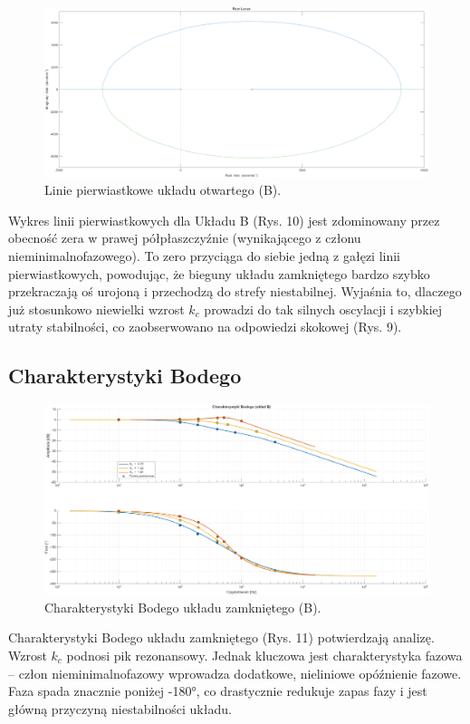 \documentclass[12pt,a4paper]{article}
\begin{document}
	\begin{figure}[H]
		\centering
		\includegraphics[width=0.8\linewidth]{zdjecia/LP_ukladB.png}
		\caption{Linie pierwiastkowe układu otwartego (B).}
		\label{fig:LP_ukladB}
	\end{figure}
	
	Wykres linii pierwiastkowych dla Układu B (Rys. 10) jest zdominowany przez obecność zera w prawej półpłaszczyźnie (wynikającego z członu nieminimalnofazowego). To zero przyciąga do siebie jedną z gałęzi linii pierwiastkowych, powodując, że bieguny układu zamkniętego bardzo szybko przekraczają oś urojoną i przechodzą do strefy niestabilnej. Wyjaśnia to, dlaczego już stosunkowo niewielki wzrost $k_c$ prowadzi do tak silnych oscylacji i szybkiej utraty stabilności, co zaobserwowano na odpowiedzi skokowej (Rys. 9).
	
	\subsection{Charakterystyki Bodego}
	
	\begin{figure}[H]
		\centering
		\includegraphics[width=1\linewidth]{zdjecia/Bode_ukladB.png}
		\caption{Charakterystyki Bodego układu zamkniętego (B).}
		\label{fig:Bode_ukladB}
	\end{figure}
	
	Charakterystyki Bodego układu zamkniętego (Rys. 11) potwierdzają analizę. Wzrost $k_c$ podnosi pik rezonansowy. Jednak kluczowa jest charakterystyka fazowa – człon nieminimalnofazowy wprowadza dodatkowe, nieliniowe opóźnienie fazowe. Faza spada znacznie poniżej -180°, co drastycznie redukuje zapas fazy i jest główną przyczyną niestabilności układu.
	
\end{document}

